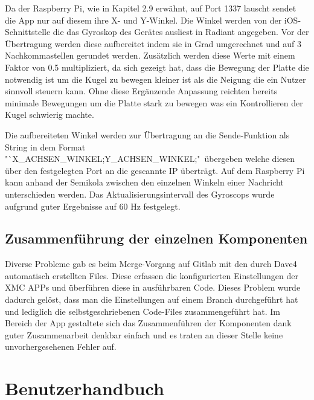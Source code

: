 \documentclass[12pt,a4paper,bibliography=totoc,listof=totoc]{scrartcl}
\begin{document}
Da der Raspberry Pi, wie in Kapitel 2.9 erwähnt, auf Port 1337 lauscht sendet die App nur auf diesem ihre X- und Y-Winkel. Die Winkel werden 
von der iOS-Schnittstelle die das Gyroskop des Gerätes ausliest in Radiant angegeben. Vor der Übertragung werden diese aufbereitet indem
sie in Grad umgerechnet und auf 3 Nachkommastellen gerundet werden. Zusätzlich werden diese Werte mit einem Faktor von 0.5 multipliziert, da sich
gezeigt hat, dass die Bewegung der Platte die notwendig ist um die Kugel zu bewegen kleiner ist als die Neigung die ein Nutzer sinnvoll steuern kann. 
Ohne diese Ergänzende Anpassung reichten bereits minimale Bewegungen um die Platte stark zu bewegen was ein Kontrollieren der Kugel schwierig machte.

Die aufbereiteten Winkel werden zur Übertragung an die Sende-Funktion als String in dem Format 
"`X\_ACHSEN\_WINKEL;Y\_ACHSEN\_WINKEL;"\ übergeben welche diesen über den festgelegten Port an die gescannte IP überträgt.
Auf dem Raspberry Pi kann anhand der Semikola zwischen den einzelnen Winkeln einer Nachricht unterschieden werden. 
Das Aktualisierungsintervall des Gyroscops wurde aufgrund guter Ergebnisse auf 60 Hz festgelegt. 

\subsection{Zusammenführung der einzelnen Komponenten}
Diverse Probleme gab es beim Merge-Vorgang auf Gitlab mit den durch Dave4 automatisch erstellten Files. 
Diese erfassen die konfigurierten Einstellungen der XMC APPs und überführen diese in ausführbaren Code. 
Dieses Problem wurde dadurch gelöst, dass man die Einstellungen auf einem Branch durchgeführt hat und 
lediglich die selbstgeschriebenen Code-Files zusammengeführt hat. Im Bereich der App gestaltete sich das 
Zusammenführen der Komponenten dank guter Zusammenarbeit denkbar einfach und es traten an dieser Stelle 
keine unvorhergesehenen Fehler auf.

\pagebreak
\section{Benutzerhandbuch}
\end{document}
